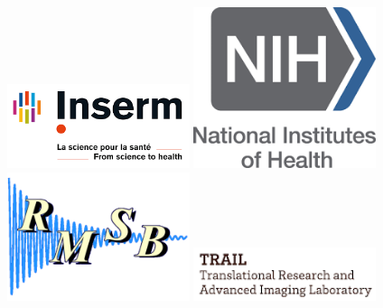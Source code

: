 \begin{center}
\includegraphics[width=0.4\textwidth]{images/logos/logo_inserm.png}
\includegraphics[width=0.4\textwidth]{images/logos/logo_NIH.png}
\includegraphics[width=0.4\textwidth]{images/logos/logo_rmsb.png}
\includegraphics[width=0.4\textwidth]{images/logos/logo_trail.png}

\end{center}

\vfill


